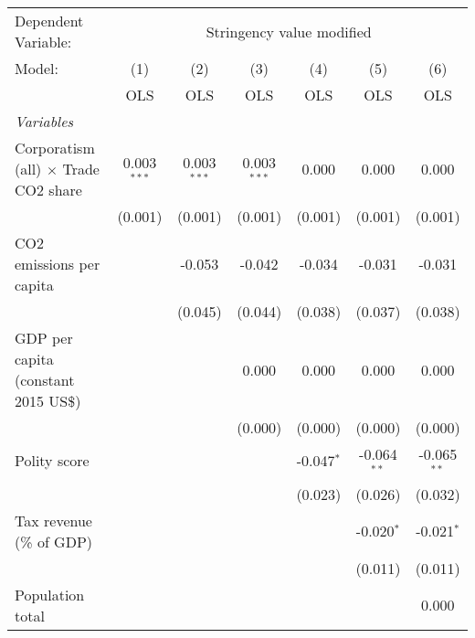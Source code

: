 
\begingroup
\centering
\begin{tabular}{lcccccc}
   \toprule
   Dependent Variable: & \multicolumn{6}{c}{Stringency value modified}\\
   Model:                                      & (1)           & (2)           & (3)           & (4)          & (5)           & (6)\\  
                                               &  OLS          & OLS           & OLS           & OLS          & OLS           & OLS\\  
   \midrule
   \emph{Variables}\\
   Corporatism (all) $\times$ Trade CO2 share  & 0.003$^{***}$ & 0.003$^{***}$ & 0.003$^{***}$ & 0.000        & 0.000         & 0.000\\   
                                               & (0.001)       & (0.001)       & (0.001)       & (0.001)      & (0.001)       & (0.001)\\   
   CO2 emissions per capita                    &               & -0.053        & -0.042        & -0.034       & -0.031        & -0.031\\   
                                               &               & (0.045)       & (0.044)       & (0.038)      & (0.037)       & (0.038)\\   
   GDP per capita (constant 2015 US\$)         &               &               & 0.000         & 0.000        & 0.000         & 0.000\\   
                                               &               &               & (0.000)       & (0.000)      & (0.000)       & (0.000)\\   
   Polity score                                &               &               &               & -0.047$^{*}$ & -0.064$^{**}$ & -0.065$^{**}$\\   
                                               &               &               &               & (0.023)      & (0.026)       & (0.032)\\   
   Tax revenue (\% of GDP)                     &               &               &               &              & -0.020$^{*}$  & -0.021$^{*}$\\   
                                               &               &               &               &              & (0.011)       & (0.011)\\   
   Population total                            &               &               &               &              &               & 0.000\\   

\end{tabular}
